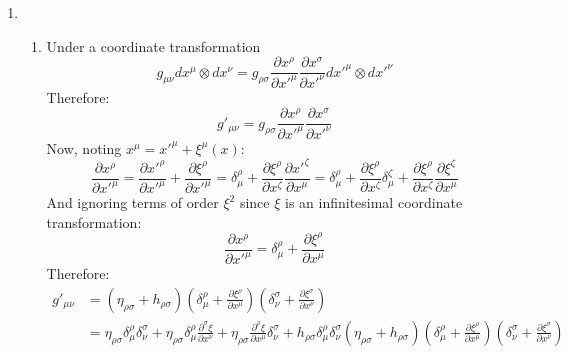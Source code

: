\documentclass[12pt,a4]{article}
\begin{document}
\begin{enumerate}
  \item
    \begin{enumerate}
      \item 
        Under a coordinate transformation
        \begin{equation*}
          g_{\mu\nu} dx^\mu \otimes dx^\nu = g_{\rho \sigma} \frac{\partial x^\rho}{\partial x'^\mu} \frac{\partial x^\sigma}{\partial x'^\nu} dx'^\mu \otimes dx'^\nu
        \end{equation*}
        Therefore:
        \begin{equation*}
          g'_{\mu\nu} = g_{\rho \sigma} \frac{\partial x^\rho}{\partial x'^\mu} \frac{\partial x^\sigma}{\partial x'^\nu} 
        \end{equation*}
        Now, noting $x^\mu = x'^\mu + \xi^\mu(x)$:
        \begin{equation*}
          \frac{\partial x^\rho}{\partial x'^\mu} = \frac{\partial x'^\rho}{\partial x'^\mu} + \frac{\partial \xi^\rho}{\partial x'^\mu} = \delta^\rho_\mu + \frac{\partial \xi^\rho}{\partial x^\zeta} \frac{\partial x'^\zeta}{\partial x^\mu} = \delta^\rho_\mu + \frac{\partial \xi^\rho}{\partial x^\zeta} \delta^\zeta_\mu + \frac{\partial \xi^\rho}{\partial x^\zeta}\frac{\partial\xi^\zeta}{\partial x^\mu} 
        \end{equation*}
        And ignoring terms of order $\xi^2$ since $\xi$ is an infinitesimal coordinate transformation:
        \begin{equation*}
          \frac{\partial x^\rho}{\partial x'^\mu} = \delta^\rho_\mu + \frac{\partial \xi^\rho}{\partial x^\mu} 
        \end{equation*}
        Therefore:
        \begin{align*}
          g'_{\mu\nu} &= \left(\eta_{\rho \sigma} + h_{\rho \sigma }\right) \left(\delta^\rho_\mu + \frac{\partial \xi^\rho}{\partial x^\mu}\right) \left(\delta^\sigma_\nu + \frac{\partial \xi^\sigma}{\partial x^\nu}\right)\\
                      &= \eta_{\rho \sigma} \delta^\rho_\mu \delta^\sigma_\nu + \eta_{\rho \sigma} \delta^\rho_\mu \frac{\partial^\sigma \xi}{\partial x^\nu} + \eta_{\rho \sigma} \frac{\partial^\rho \xi}{\partial x^\mu} \delta^\sigma_\nu + h_{\rho\sigma}\delta^\rho_\mu\delta^\sigma_\nu\left(\eta_{\rho \sigma} + h_{\rho \sigma }\right) \left(\delta^\rho_\mu + \frac{\partial \xi^\rho}{\partial x^\mu}\right) \left(\delta^\sigma_\nu + \frac{\partial \xi^\sigma}{\partial x^\nu}\right)
        \end{align*}

\end{enumerate}
\end{enumerate}
\end{document}

